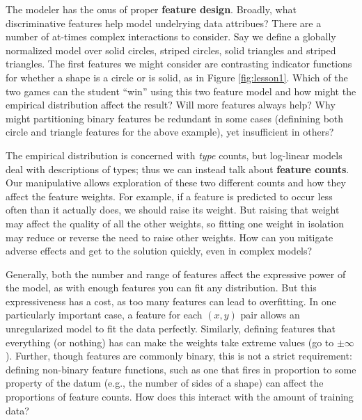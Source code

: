 \documentclass[11pt,letterpaper]{article}
\begin{document}
The modeler has the onus of proper \textbf{feature design}. Broadly, what discriminative features 
help model undelrying data attribues? There are a number of at-times complex interactions 
to consider. Say we define a globally 
normalized model over solid circles, striped circles, solid triangles and striped triangles. 
The first features we might consider are contrasting indicator functions for whether a shape
is a circle or is solid, as in Figure \ref{fig:lesson1}. Which of the two games can the student 
``win'' using this two feature model and how might the empirical distribution affect the result? 
Will more features always help? Why might partitioning binary 
features be redundant in some cases (definining both circle and triangle features for the above example), 
yet insufficient in others?

The empirical distribution is concerned with \textit{type} counts, but log-linear models 
deal with descriptions of types; thus we can instead talk about \textbf{feature counts}. Our 
manipulative allows exploration of these two different counts and how they affect the 
feature weights. For example, if a feature is predicted to occur less often than it actually does, 
we should raise its weight. But raising that weight 
may affect the quality of all the other weights, so fitting one weight in
isolation may reduce or reverse the need to raise other weights. How can you mitigate  
adverse effects and get to the solution quickly, even in complex models?

Generally, both the number and range of features affect the expressive 
power of the model, as with enough features you can fit any distribution. But this expressiveness 
has a cost, as too many features can lead to overfitting. 
In one particularly important case, a feature for each $(x,y)$ pair allows an unregularized model to fit the 
data perfectly. 
Similarly, defining features that everything (or nothing) has can make the weights 
take extreme values (go to $\pm \infty$). Further, though features are commonly binary, 
this is not a strict requirement: defining non-binary feature functions, such as one that fires in 
proportion to some property of the datum (e.g., the number of sides of a shape) can affect the
proportions of feature counts. How does this interact with the amount of training data?
\end{document}

